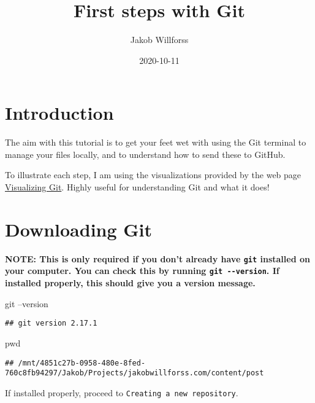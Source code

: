 \documentclass[]{article}
\title{First steps with Git}
\author{Jakob Willforss}
\date{2020-10-11}
\newenvironment{Shaded}{\begin{snugshade}}{\end{snugshade}}
\newcommand{\BuiltInTok}[1]{#1}
\newcommand{\FunctionTok}[1]{\textcolor[rgb]{0.00,0.00,0.00}{#1}}
\newcommand{\NormalTok}[1]{#1}
\begin{document}
\maketitle

\hypertarget{introduction}{%
\section{Introduction}\label{introduction}}

The aim with this tutorial is to get your feet wet with using the Git
terminal to manage your files locally, and to understand how to send
these to GitHub.

To illustrate each step, I am using the visualizations provided by the
web page \href{http://git-school.github.io/visualizing-git/}{Visualizing
Git}. Highly useful for understanding Git and what it does!

\hypertarget{downloading-git}{%
\section{Downloading Git}\label{downloading-git}}

\textbf{NOTE: This is only required if you don't already have
\texttt{git} installed on your computer. You can check this by running
\texttt{git\ -\/-version}. If installed properly, this should give you a
version message.}

\begin{Shaded}
\begin{Highlighting}[]
\FunctionTok{git}\NormalTok{ --version}
\end{Highlighting}
\end{Shaded}

\begin{verbatim}
## git version 2.17.1
\end{verbatim}

\begin{Shaded}
\begin{Highlighting}[]
\BuiltInTok{pwd}
\end{Highlighting}
\end{Shaded}

\begin{verbatim}
## /mnt/4851c27b-0958-480e-8fed-760c8fb94297/Jakob/Projects/jakobwillforss.com/content/post
\end{verbatim}

If installed properly, proceed to \texttt{Creating\ a\ new\ repository}.
\end{document}
